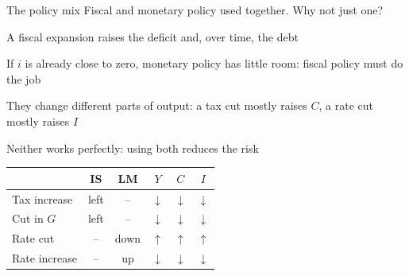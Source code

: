 \documentclass[aspectratio=169,xcolor=table]{beamer}
\begin{document}
\begin{frame}{The policy mix}
\small
Fiscal and monetary policy used together. Why not just one?
\bi
  \item A fiscal expansion raises the deficit and, over time, the debt
  \item If $i$ is already close to zero, monetary policy has little room: fiscal policy must do the job
  \item They change different parts of output: a tax cut mostly raises $C$, a rate cut mostly raises $I$
  \item Neither works perfectly: using both reduces the risk
\ei
\vspace{0.1cm}
\centering\footnotesize
\begin{tabular}{lccccc}
\toprule
 & \textbf{IS} & \textbf{LM} & $Y$ & $C$ & $I$ \\
\midrule
Tax increase & left & -- & $\downarrow$ & $\downarrow$ & $\downarrow$ \\
Cut in $G$ & left & -- & $\downarrow$ & $\downarrow$ & $\downarrow$ \\
Rate cut & -- & down & $\uparrow$ & $\uparrow$ & $\uparrow$ \\
Rate increase & -- & up & $\downarrow$ & $\downarrow$ & $\downarrow$ \\
\bottomrule
\end{tabular}
\end{frame}
\end{document}
